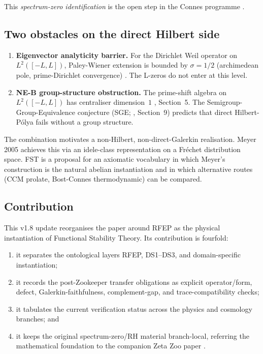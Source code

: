 \documentclass[11pt,a4paper]{article}
\theoremstyle{plain}
\theoremstyle{definition}
\begin{document}
This \emph{spectrum-zero identification} is the open step in the
Connes programme
\cite{Connes1999,Connes2026,ConnesConsaniMoscovici2025}.

\subsection{Two obstacles on the direct Hilbert side}

\begin{enumerate}[leftmargin=*]
  \item \textbf{Eigenvector analyticity barrier.}  For the Dirichlet
    Weil operator on $L^2([-L,L])$, Paley-Wiener extension is bounded
    by $\sigma = 1/2$ (archimedean pole, prime-Dirichlet convergence)
    \cite{AnalyticKernelV2,C2LayerStatus}.  The L-zeros do not
    enter at this level.
  \item \textbf{NE-B group-structure obstruction.}  The prime-shift
    algebra on $L^2([-L,L])$ has centraliser dimension~$1$
    \cite{Geiger2026RHII}, Section~5.  The Semigroup-Group-Equivalence
    conjecture (SGE; \cite{MathMaster}, Section~9) predicts that direct
    Hilbert-P\'olya fails without a group structure.
\end{enumerate}

The combination motivates a non-Hilbert, non-direct-Galerkin
realisation.  Meyer 2005 achieves this via an idele-class
representation on a Fr\'echet distribution space.  FST is a proposal
for an axiomatic vocabulary in which Meyer's construction is the
natural abelian instantiation and in which alternative routes (CCM
prolate, Bost-Connes thermodynamic) can be compared.

\subsection{Contribution}

This v1.8 update reorganises the paper around RFEP as the physical
instantiation of Functional Stability Theory.  Its contribution is
fourfold:
\begin{enumerate}[leftmargin=*]
  \item it separates the ontological layers RFEP, DS1--DS3, and
    domain-specific instantiation;
  \item it records the post-Zookeeper transfer obligations as
    explicit operator/form, defect, Galerkin-faithfulness,
    complement-gap, and trace-compatibility checks;
  \item it tabulates the current verification status across the
    physics and cosmology branches; and
  \item it keeps the original spectrum-zero/RH material branch-local,
    referring the mathematical foundation to the companion Zeta Zoo
    paper \cite{ZetaZooMaster}.
\end{enumerate}
\end{document}
